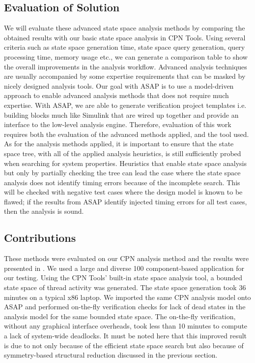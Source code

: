 \subsection{Evaluation of Solution}
We will evaluate these advanced state space analysis methods by comparing the obtained results with our basic state space analysis in CPN Tools. Using several criteria such as state space generation time, state space query generation, query processing time, memory usage etc., we can generate a comparison table to show the overall improvements in the analysis workflow. Advanced analysis techniques are usually accompanied by some expertise requirements that can be masked by nicely designed analysis tools. Our goal with ASAP is to use a model-driven approach to enable advanced analysis methods that does not require much expertise. With ASAP, we are able to generate verification project templates i.e. building blocks much like Simulink that are wired up together and provide an interface to the low-level analysis engine. Therefore, evaluation of this work requires both the evaluation of the advanced methods applied, and the tool used. As for the analysis methods applied, it is important to ensure that the state space tree, with all of the applied analysis heuristics, is still sufficiently probed when searching for system properties. Heuristics that enable state space analysis but only by partially checking the tree can lead the case where the state space analysis does not identify timing errors because of the incomplete search. This will be checked with negative test cases where the design model is known to be flawed; if the results from ASAP identify injected timing errors for all test cases, then the analysis is sound. 

\subsection{Contributions}
These methods were evaluated on our CPN analysis method and the results were presented in \cite{SEUS}. We used a large and diverse 100 component-based application for our testing. Using the CPN Tools' built-in state space analysis tool, a bounded state space of thread activity was generated. The state space generation took 36 minutes on a typical x86 laptop. We imported the same CPN analysis model onto ASAP and performed on-the-fly verification checks for lack of dead states in the analysis model for the same bounded state space. The on-the-fly verification, without any graphical interface overheads, took less than 10 minutes to compute a lack of system-wide deadlocks. It must be noted here that this improved result is due to not only because of the efficient state space search but also because of symmetry-based structural reduction discussed in the previous section.

